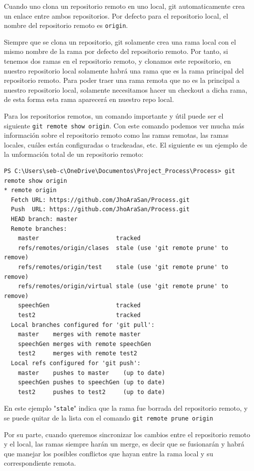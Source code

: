Cuando uno clona un repositorio remoto en uno local, git automaticamente crea un enlace entre ambos repositorios. Por defecto para el repositorio local, el nombre del repositorio remoto es \texttt{origin}. 

Siempre que se clona un repositorio, git solamente crea una rama local con el mismo nombre de la rama por defecto del repositorio remoto. Por tanto, si tenemos dos ramas en el repositorio remoto, y clonamos este repositorio, en nuestro repositorio local solamente habrá una rama que es la rama principal del repositorio remoto. Para poder traer una rama remota que no es la principal a nuestro repositorio local, solamente necesitamos hacer un checkout a dicha rama, de esta forma esta rama aparecerá en nuestro repo local.

Para los repositorios remotos, un comando importante y útil puede ser el siguiente \texttt{git remote show origin}. Con este comando podemos ver mucha más información sobre el repositorio remoto como las ramas remotas, las ramas locales, cuáles están configuradas o trackeadas, etc. El siguiente es un ejemplo de la unformación total de un repositorio remoto:

\begin{verbatim}
PS C:\Users\seb-c\OneDrive\Documentos\Project_Process\Process> git remote show origin
* remote origin
  Fetch URL: https://github.com/JhoAraSan/Process.git
  Push  URL: https://github.com/JhoAraSan/Process.git
  HEAD branch: master
  Remote branches:
    master                      tracked
    refs/remotes/origin/clases  stale (use 'git remote prune' to remove)
    refs/remotes/origin/test    stale (use 'git remote prune' to remove)
    refs/remotes/origin/virtual stale (use 'git remote prune' to remove)
    speechGen                   tracked
    test2                       tracked
  Local branches configured for 'git pull':
    master    merges with remote master
    speechGen merges with remote speechGen
    test2     merges with remote test2
  Local refs configured for 'git push':
    master    pushes to master    (up to date)
    speechGen pushes to speechGen (up to date)
    test2     pushes to test2     (up to date)
\end{verbatim}

En este ejemplo "\texttt{stale}" indica que la rama fue borrada del repositorio remoto, y se puede quitar de la lista con el comando \texttt{git remote prune origin}

Por su parte, cuando queremos sincronizar los cambios entre el repositorio remoto y el local, las ramas siempre harán un merge, es decir que se fusionarán y habrá que manejar los posibles conflictos que hayan entre la rama local y su correspondiente remota.  

